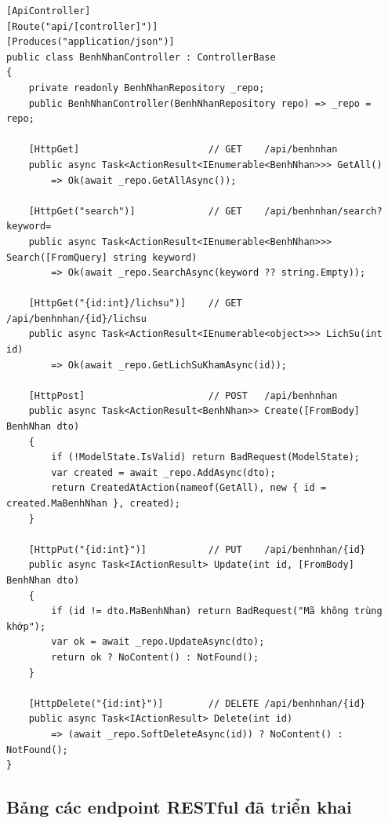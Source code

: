 \documentclass[12pt,a4paper]{report}
\begin{document}
\begin{lstlisting}[style=csharp,caption={BenhNhanController -- chuẩn REST CRUD}]
[ApiController]
[Route("api/[controller]")]
[Produces("application/json")]
public class BenhNhanController : ControllerBase
{
    private readonly BenhNhanRepository _repo;
    public BenhNhanController(BenhNhanRepository repo) => _repo = repo;

    [HttpGet]                       // GET    /api/benhnhan
    public async Task<ActionResult<IEnumerable<BenhNhan>>> GetAll()
        => Ok(await _repo.GetAllAsync());

    [HttpGet("search")]             // GET    /api/benhnhan/search?keyword=
    public async Task<ActionResult<IEnumerable<BenhNhan>>> Search([FromQuery] string keyword)
        => Ok(await _repo.SearchAsync(keyword ?? string.Empty));

    [HttpGet("{id:int}/lichsu")]    // GET    /api/benhnhan/{id}/lichsu
    public async Task<ActionResult<IEnumerable<object>>> LichSu(int id)
        => Ok(await _repo.GetLichSuKhamAsync(id));

    [HttpPost]                      // POST   /api/benhnhan
    public async Task<ActionResult<BenhNhan>> Create([FromBody] BenhNhan dto)
    {
        if (!ModelState.IsValid) return BadRequest(ModelState);
        var created = await _repo.AddAsync(dto);
        return CreatedAtAction(nameof(GetAll), new { id = created.MaBenhNhan }, created);
    }

    [HttpPut("{id:int}")]           // PUT    /api/benhnhan/{id}
    public async Task<IActionResult> Update(int id, [FromBody] BenhNhan dto)
    {
        if (id != dto.MaBenhNhan) return BadRequest("Mã không trùng khớp");
        var ok = await _repo.UpdateAsync(dto);
        return ok ? NoContent() : NotFound();
    }

    [HttpDelete("{id:int}")]        // DELETE /api/benhnhan/{id}
    public async Task<IActionResult> Delete(int id)
        => (await _repo.SoftDeleteAsync(id)) ? NoContent() : NotFound();
}
\end{lstlisting}

\subsection{Bảng các endpoint RESTful đã triển khai}
\end{document}
